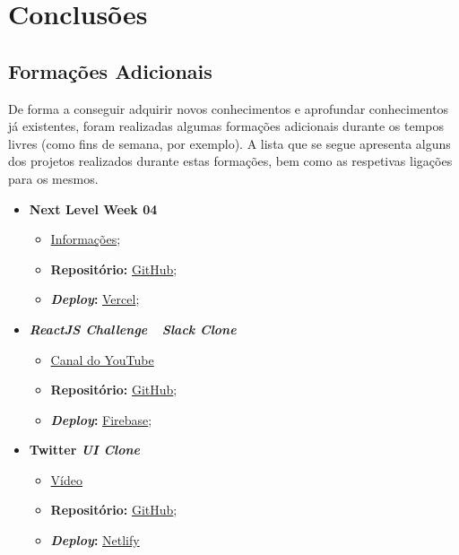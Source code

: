 \chapter{Conclusões}


\section{Formações Adicionais}

De forma a conseguir adquirir novos conhecimentos e aprofundar conhecimentos já existentes, foram realizadas algumas formações adicionais durante os tempos livres (como fins de semana, por exemplo). A lista que se segue apresenta alguns dos projetos realizados durante estas formações, bem como as respetivas ligações para os mesmos.


\begin{minipage}[Ht]{0.45\textwidth}
	\begin{itemize}
		\item \textbf{Next Level Week 04}
			\begin{itemize}
				\item \href{http://nextlevelweek.com/}{Informações};
				\item \textbf{Repositório:} \href{https://github.com/TutoDS/nlw04-react}{GitHub};
				\item \textbf{\textit{Deploy}:} \href{https://move-it-tutods.vercel.app}{Vercel};
			\end{itemize}

		\item \textbf{\textit{ReactJS Challenge~\textemdash~Slack Clone}}
			\begin{itemize}
				\item \href{https://www.youtube.com/channel/UCqrILQNl5Ed9Dz6CGMyvMTQ}{Canal do YouTube}
				\item \textbf{Repositório:} \href{https://github.com/TutoDS/reactjs-slack-clone-challenge}{GitHub};
				\item \textbf{\textit{Deploy}:} \href{https://slack-clone-challenge-c35ca.web.app/}{Firebase};
			\end{itemize}

			\item \textbf{Twitter \textit{UI Clone}}
			\begin{itemize}
				\item \href{https://www.youtube.com/watch?v=K-8z_4xvT3o}{Vídeo}
				\item \textbf{Repositório:} \href{https://github.com/TutoDS/twitter-ui-clone}{GitHub};
				\item \textbf{\textit{Deploy}:} \href{https://twitter-clone-tutods.netlify.app/}{Netlify}
			\end{itemize}
	\end{itemize}
\end{minipage}
